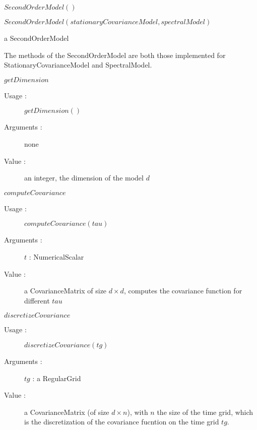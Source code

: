\begin{description}

\item[Usage :] \rule{0pt}{1em}
  \begin{description}  
  \item $SecondOrderModel()$
  \item $SecondOrderModel(stationaryCovarianceModel, spectralModel)$
  \end{description}
  \bigskip

\item[Arguments :]  \rule{0pt}{1em}

  \bigskip

\item[Value :] a SecondOrderModel
  \bigskip

\item[Some methods :]  \rule{0pt}{1em}

The methods of the SecondOrderModel are both those implemented for StationaryCovarianceModel and SpectralModel.

   \item $getDimension$
    \begin{description}
    \item[Usage :] $getDimension()$
    \item[Arguments :] none
    \item[Value :]   an integer, the dimension of the model $d$
    \end{description}
    \bigskip

  \item $computeCovariance$
    \begin{description}
    \item[Usage :] $computeCovariance(tau)$
    \item[Arguments :] $t$ : NumericalScalar
    \item[Value :] a CovarianceMatrix of size $d\times d$, computes the covariance function for different $tau$
    \end{description}
    \bigskip

  \item $discretizeCovariance$
    \begin{description}
    \item[Usage :] $discretizeCovariance(tg)$
    \item[Arguments :] $tg$ :  a RegularGrid
    \item[Value :] a CovarianceMatrix (of size $d\times  n$), with $n$ the size of the time grid,
    which is the discretization of the covariance fucntion on the time grid $tg$.
    \end{description}
    \bigskip


\end{description}

